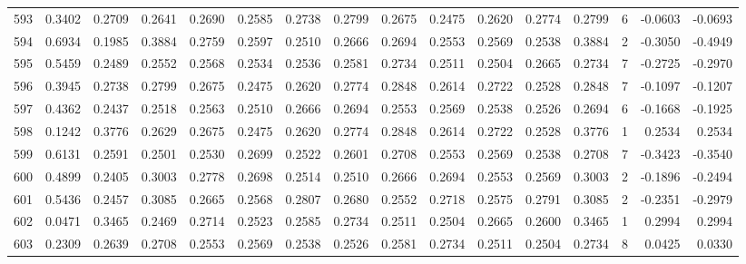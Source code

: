 \begin{tabular}{lrrrrrrrrrrrrrrr}
593 &      0.3402 &  0.2709 &  0.2641 &  0.2690 &  0.2585 &  0.2738 &  0.2799 &  0.2675 &  0.2475 &  0.2620 &   0.2774 &     0.2799 &      6 &                   -0.0603 &                    -0.0693 \\
594 &      0.6934 &  0.1985 &  0.3884 &  0.2759 &  0.2597 &  0.2510 &  0.2666 &  0.2694 &  0.2553 &  0.2569 &   0.2538 &     0.3884 &      2 &                   -0.3050 &                    -0.4949 \\
595 &      0.5459 &  0.2489 &  0.2552 &  0.2568 &  0.2534 &  0.2536 &  0.2581 &  0.2734 &  0.2511 &  0.2504 &   0.2665 &     0.2734 &      7 &                   -0.2725 &                    -0.2970 \\
596 &      0.3945 &  0.2738 &  0.2799 &  0.2675 &  0.2475 &  0.2620 &  0.2774 &  0.2848 &  0.2614 &  0.2722 &   0.2528 &     0.2848 &      7 &                   -0.1097 &                    -0.1207 \\
597 &      0.4362 &  0.2437 &  0.2518 &  0.2563 &  0.2510 &  0.2666 &  0.2694 &  0.2553 &  0.2569 &  0.2538 &   0.2526 &     0.2694 &      6 &                   -0.1668 &                    -0.1925 \\
598 &      0.1242 &  0.3776 &  0.2629 &  0.2675 &  0.2475 &  0.2620 &  0.2774 &  0.2848 &  0.2614 &  0.2722 &   0.2528 &     0.3776 &      1 &                    0.2534 &                     0.2534 \\
599 &      0.6131 &  0.2591 &  0.2501 &  0.2530 &  0.2699 &  0.2522 &  0.2601 &  0.2708 &  0.2553 &  0.2569 &   0.2538 &     0.2708 &      7 &                   -0.3423 &                    -0.3540 \\
600 &      0.4899 &  0.2405 &  0.3003 &  0.2778 &  0.2698 &  0.2514 &  0.2510 &  0.2666 &  0.2694 &  0.2553 &   0.2569 &     0.3003 &      2 &                   -0.1896 &                    -0.2494 \\
601 &      0.5436 &  0.2457 &  0.3085 &  0.2665 &  0.2568 &  0.2807 &  0.2680 &  0.2552 &  0.2718 &  0.2575 &   0.2791 &     0.3085 &      2 &                   -0.2351 &                    -0.2979 \\
602 &      0.0471 &  0.3465 &  0.2469 &  0.2714 &  0.2523 &  0.2585 &  0.2734 &  0.2511 &  0.2504 &  0.2665 &   0.2600 &     0.3465 &      1 &                    0.2994 &                     0.2994 \\
603 &      0.2309 &  0.2639 &  0.2708 &  0.2553 &  0.2569 &  0.2538 &  0.2526 &  0.2581 &  0.2734 &  0.2511 &   0.2504 &     0.2734 &      8 &                    0.0425 &                     0.0330 \\

\end{tabular}
